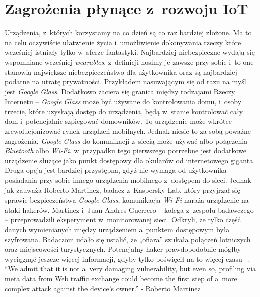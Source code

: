 \documentclass{xmgr}
\begin{document}
\section{Zagrożenia płynące z~rozwoju IoT}
	Urządzenia, z~których korzystamy na co dzień są co raz bardziej złożone. Ma to na celu oczywiście ułatwienie życia i~umożliwienie dokonywania rzeczy które wcześniej istniały tylko w~sferze fantastyki. 
	Najbardziej niebezpieczne wydają się wspomniane wcześniej \emph{wearables}. z~definicji nosimy je zawsze przy sobie i~to one stanowią największe niebezpieczeństwo dla użytkownika oraz są najbardziej podatne na utratę prywatności. Przykładem nasuwającym się od razu na myśl jest \emph{Google Glass}. Dodatkowo zaciera się granica między rodzajami Rzeczy Internetu – \emph{Google Glass} może być używane do kontrolowania domu, i~osoby trzecie, które uzyskają dostęp do urządzenia, będą w~stanie kontrolować cały dom i~potencjalnie szpiegować domowników.
	To urządzenie może wkrótce zrewolucjonizować rynek urządzeń mobilnych. Jednak niesie to za sobą poważne zagrożenia. \emph{Google Glass} do komunikacji z~siecią może używać albo połączenia \emph{Bluetooth} albo \emph{Wi-Fi}. w~przypadku tego pierwszego potrzebne jest dodatkowe urządzenie służące jako punkt dostępowy dla okularów od internetowego giganta. Druga opcja jest bardziej przystępna, gdyż nie wymaga od użytkownika posiadania przy sobie innego urządzenia mobilnego z~dostępem do sieci. Jednak jak zauważa Roberto Martinez, badacz z~Kaspersky Lab, który przyjrzał się sprawie bezpieczeństwa \emph{Google Glass}, komunikacja \emph{Wi-Fi} naraża urządzenie na ataki hakerów. Martinez i~Juan Andres Guerrero – kolega z~zespołu badawczego – przeprowadzili eksperyment w~monitorowanej sieci. Odkryli, że tylko część danych wymienianych między urządzeniem a~punktem dostępowym była szyfrowana. Badaczom udało się ustalić, że „ofiara” szukała połączeń lotniczych oraz miejscowości turystycznych. Potencjalny haker prawdopodobnie mógłby wyciągnąć jeszcze więcej informacji, gdyby tylko poświęcił na to więcej czasu~ \cite{Abusing}.
	“We admit that it is not a~very damaging vulnerability, but even so, profiling via meta data from Web traffic exchange could become the first step of a~more complex attack against the device’s owner.” - Roberto Martinez
\end{document}
